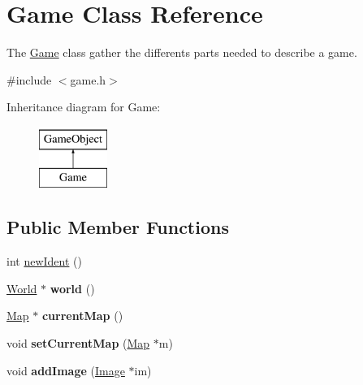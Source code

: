 \hypertarget{class_game}{\section{\-Game \-Class \-Reference}
\label{class_game}
}


\-The \hyperlink{class_game}{\-Game} class gather the differents parts needed to describe a game.  




{\ttfamily \#include $<$game.\-h$>$}

\-Inheritance diagram for \-Game\-:\begin{figure}[H]
\begin{center}
\leavevmode
\includegraphics[height=2.000000cm]{class_game}
\end{center}
\end{figure}
\subsection*{\-Public \-Member \-Functions}
\begin{DoxyCompactItemize}
\item 
int \hyperlink{class_game_aeed0ba100700fb2f5d701fcf14d8871e}{new\-Ident} ()
\item 
\hypertarget{class_game_a38feaf6c233d25c2ad353bab65559790}{\hyperlink{class_world}{\-World} $\ast$ {\bfseries world} ()}\label{class_game_a38feaf6c233d25c2ad353bab65559790}

\item 
\hypertarget{class_game_a3b242dcb7703b409692ce0c91e799a8c}{\hyperlink{class_map}{\-Map} $\ast$ {\bfseries current\-Map} ()}\label{class_game_a3b242dcb7703b409692ce0c91e799a8c}

\item 
\hypertarget{class_game_af7394ea8ff98b0b819125a6bac47db2b}{void {\bfseries set\-Current\-Map} (\hyperlink{class_map}{\-Map} $\ast$m)}\label{class_game_af7394ea8ff98b0b819125a6bac47db2b}

\item 
\hypertarget{class_game_a8c246c639e16c351b7f261dc44a0897d}{void {\bfseries add\-Image} (\hyperlink{class_image}{\-Image} $\ast$im)}\label{class_game_a8c246c639e16c351b7f261dc44a0897d}

\end{DoxyCompactItemize}



